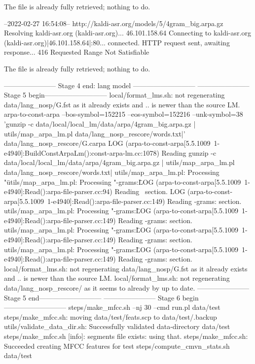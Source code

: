     The file is already fully retrieved; nothing to do.

--2022-02-27 16:54:08--  http://kaldi-asr.org/models/5/4gram_big.arpa.gz
Resolving kaldi-asr.org (kaldi-asr.org)... 46.101.158.64
Connecting to kaldi-asr.org (kaldi-asr.org)|46.101.158.64|:80... connected.
HTTP request sent, awaiting response... 416 Requested Range Not Satisfiable

    The file is already fully retrieved; nothing to do.

----------------------- Stage 4 end: lang model ---------------------------
----------------------- Stage 5 begin---------------------------
local/format_lms.sh: not regenerating data/lang_nosp/G.fst as it already exists and 
.. is newer than the source LM.
arpa-to-const-arpa --bos-symbol=152215 --eos-symbol=152216 --unk-symbol=38 'gunzip -c data/local/local_lm/data/arpa/4gram_big.arpa.gz | utils/map_arpa_lm.pl data/lang_nosp_rescore/words.txt|' data/lang_nosp_rescore/G.carpa 
LOG (arpa-to-const-arpa[5.5.1009~1-e4940]:BuildConstArpaLm():const-arpa-lm.cc:1078) Reading gunzip -c data/local/local_lm/data/arpa/4gram_big.arpa.gz | utils/map_arpa_lm.pl data/lang_nosp_rescore/words.txt|
utils/map_arpa_lm.pl: Processing "\data\"
utils/map_arpa_lm.pl: Processing "\1-grams:\"
LOG (arpa-to-const-arpa[5.5.1009~1-e4940]:Read():arpa-file-parser.cc:94) Reading \data\ section.
LOG (arpa-to-const-arpa[5.5.1009~1-e4940]:Read():arpa-file-parser.cc:149) Reading \1-grams: section.
utils/map_arpa_lm.pl: Processing "\2-grams:\"
LOG (arpa-to-const-arpa[5.5.1009~1-e4940]:Read():arpa-file-parser.cc:149) Reading \2-grams: section.
utils/map_arpa_lm.pl: Processing "\3-grams:\"
LOG (arpa-to-const-arpa[5.5.1009~1-e4940]:Read():arpa-file-parser.cc:149) Reading \3-grams: section.
utils/map_arpa_lm.pl: Processing "\4-grams:\"
LOG (arpa-to-const-arpa[5.5.1009~1-e4940]:Read():arpa-file-parser.cc:149) Reading \4-grams: section.
local/format_lms.sh: not regenerating data/lang_nosp/G.fst as it already exists and 
.. is newer than the source LM.
local/format_lms.sh: not regenerating data/lang_nosp_rescore/ as it seems to already by up to date.
----------------------- Stage 5 end---------------------------
----------------------- Stage 6 begin---------------------------
steps/make_mfcc.sh --nj 30 --cmd run.pl data/test
steps/make_mfcc.sh: moving data/test/feats.scp to data/test/.backup
utils/validate_data_dir.sh: Successfully validated data-directory data/test
steps/make_mfcc.sh [info]: segments file exists: using that.
steps/make_mfcc.sh: Succeeded creating MFCC features for test
steps/compute_cmvn_stats.sh data/test
